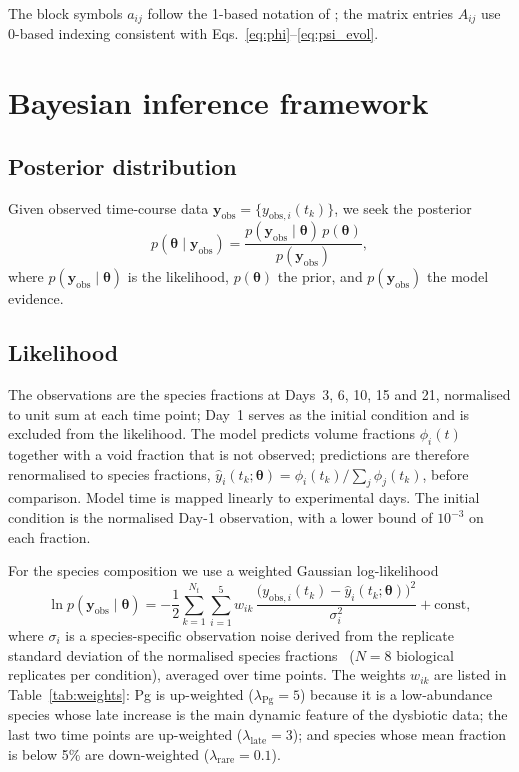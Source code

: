 \documentclass[pdflatex,sn-mathphys-ay,lineno]{sn-jnl}%
\newcommand{\btheta}{\boldsymbol{\theta}}
\newcommand{\yobs}{\mathbf{y}_{\mathrm{obs}}}
\begin{document}
The block symbols $a_{ij}$ follow the 1-based notation of \citet{Klempt2025ContinuumBiofilm}; the matrix entries $A_{ij}$ use 0-based indexing consistent with Eqs.~\eqref{eq:phi}--\eqref{eq:psi_evol}.

\section{Bayesian inference framework}
\label{sec:bayes}

\subsection{Posterior distribution}

Given observed time-course data $\yobs = \{y_{\mathrm{obs},i}(t_k)\}$, we seek the posterior
\begin{equation}
p(\btheta\mid\yobs)
= \frac{p(\yobs\mid\btheta)\,p(\btheta)}{p(\yobs)},
\label{eq:bayes}
\end{equation}
where $p(\yobs\mid\btheta)$ is the likelihood, $p(\btheta)$ the prior, and $p(\yobs)$ the model evidence.

\subsection{Likelihood}
\label{sec:likelihood}

The observations are the species fractions at Days~3, 6, 10, 15 and 21, normalised to unit sum at each time point; Day~1 serves as the initial condition and is excluded from the likelihood.
The model predicts volume fractions $\phi_i(t)$ together with a void fraction that is not observed; predictions are therefore renormalised to species fractions, $\hat{y}_i(t_k;\btheta)=\phi_i(t_k)\big/\sum_{j}\phi_j(t_k)$, before comparison.
Model time is mapped linearly to experimental days.
The initial condition is the normalised Day-1 observation, with a lower bound of $10^{-3}$ on each fraction.

For the species composition we use a weighted Gaussian log-likelihood
\begin{equation}
\ln p(\yobs\mid\btheta)
= -\frac12\sum_{k=1}^{N_t}\sum_{i=1}^{5} w_{ik}\,
\frac{\bigl(y_{\mathrm{obs},i}(t_k)-\hat{y}_i(t_k;\btheta)\bigr)^2}{\sigma_i^2} + \text{const},
\label{eq:likelihood}
\end{equation}
where $\sigma_{i}$ is a species-specific observation noise derived from the replicate standard deviation of the normalised species fractions~\citep{heine2025influence} ($N=8$ biological replicates per condition), averaged over time points.
The weights $w_{ik}$ are listed in Table~\ref{tab:weights}: Pg is up-weighted ($\lambda_{\mathrm{Pg}}=5$) because it is a low-abundance species whose late increase is the main dynamic feature of the dysbiotic data; the last two time points are up-weighted ($\lambda_{\mathrm{late}}=3$); and species whose mean fraction is below 5\% are down-weighted ($\lambda_{\mathrm{rare}}=0.1$).
\end{document}
